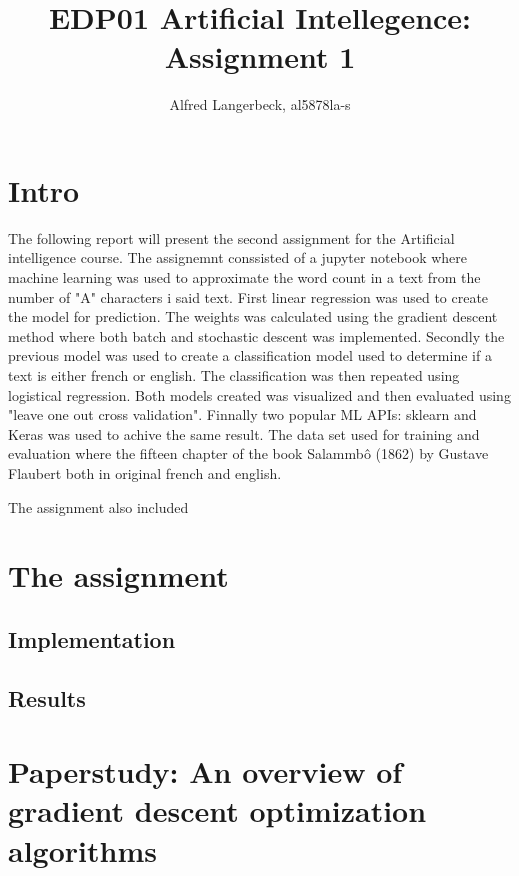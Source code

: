 \documentclass[a4paper]{article}
\title{EDP01 Artificial Intellegence: Assignment 1}
\author{Alfred Langerbeck, al5878la-s}
\begin{document}
\maketitle

\section{Intro}
The following report will present the second assignment for the Artificial intelligence course. The assignemnt conssisted of a jupyter notebook where machine learning was used to approximate the word count in a text from the number of "A" characters i said text. First linear regression was used to create the model for prediction. The weights was calculated using the gradient descent method where both batch and stochastic descent was implemented. Secondly the previous model was used to create a classification model used to determine if a text is either french or english. The classification was then repeated using logistical regression. Both models created was visualized and then evaluated using "leave one out cross validation". Finnally two popular ML APIs: sklearn and Keras was used to achive the same result. The data set used for training and evaluation where the fifteen chapter of the book Salammbô (1862) by Gustave Flaubert both in original french and english.

The assignment also included 
 
\section{The assignment}

\subsection{Implementation}

\subsection{Results}

\section{Paperstudy: An overview of gradient descent optimization algorithms}
\end{document}
